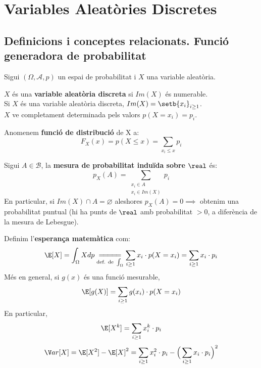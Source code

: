 \section{Variables Aleatòries Discretes}

\subsection{Definicions i conceptes relacionats. Funció generadora de probabilitat}

Sigui $(\Omega, \mathcal{A}, p)$ un espai de probabilitat i $X$ una variable aleatòria.

\begin{defi}
  $X$ és una \textbf{variable aleatòria discreta} si $Im(X)$ és numerable. \\
  Si $X$ és una variable aleatòria discreta, $Im(X) = \setb{x_{i}}_{i \geq 1}$. \\ 
  $X$ ve completament determinada pels valors $p(X=x_{i}) = p_{i}$.
\end{defi}

\begin{defi}
  Anomenem \textbf{funció de distribució} de X a:
  \[
    F_{X}(x)=p(X \leq x) = \sum_{x_{i}\leq x}p_{i}
  \]
\end{defi}

\begin{defi}
  Sigui $A \in \mathcal{B}$, la \textbf{mesura de probabilitat induïda sobre} $\real$ és:
  \[
    p_{X}(A) = \sum_{\substack{x_{i} \in A \\ x_{i}\in Im(X)}}p_{i}
  \]
  En particular, si $Im(X)\cap A = \varnothing$ aleshores $p_{X}(A) = 0 \implies$ obtenim una probabilitat puntual (hi ha punts de $\real$ amb probabilitat $> 0$, a diferència de la mesura de Lebesgue).
\end{defi}

\begin{defi}
  Definim l'\textbf{esperança matemàtica} com: 
  \[
    \E [X] = \int_{\Omega}Xdp \underset{\text{def. de }\int_{\Omega}}{=\joinrel=\joinrel=\joinrel=\joinrel=} \sum_{i\geq 1}x_{i}\cdot p(X=x_{i}) = \sum_{i\geq 1}x_{i}\cdot p_{i}
  \]
  Més en general, si $g(x)$ és una funció mesurable, 
  \[
    \E [g(X)] = \sum_{i\geq 1}g(x_{i})\cdot p(X=x_{i})
  \]
  En particular, 
  \[
    \E[X^{k}]=\sum_{i\geq 1}x_{i}^{k}\cdot p_{i}
  \]
  \[
    \V ar[X] = \E[X^{2}]-\E[X]^{2}=\sum_{i\geq 1}x_{i}^{2}\cdot p_{i} - \Big(\sum_{i\geq 1}x_{i}\cdot p_{i} \Big)^{2}
  \]
\end{defi}

